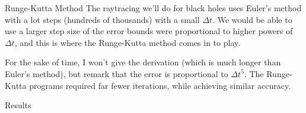\documentclass{beamer}
\begin{document}
    \begin{frame}{Runge-Kutta Method}
        The raytracing we'll do for black holes uses Euler's method with a
        lot steps (hundreds of thousands) with a small $\Delta{t}$. We would be
        able to use a larger step size of the error bounds were proportional to
        higher powers of $\Delta{t}$, and this is where the Runge-Kutta method
        comes in to play.
        \par\hfill\par
        For the sake of time, I won't give the derivation (which is much
        longer than Euler's method), but remark that the error is
        proportional to $\Delta{t}^{5}$. The Runge-Kutta programs required
        far fewer iterations, while achieving similar accuracy.
    \end{frame}
    \begin{frame}{Results}
        \begin{figure}
            \centering
        \end{figure}
    \end{frame}
\end{document}
